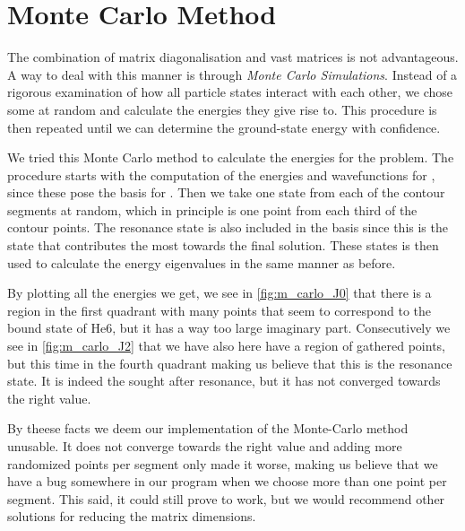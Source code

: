 \documentclass[../main/report.tex]{subfiles}
\begin{document}
\chapter{Monte Carlo Method}
\label{cha:monte_carlo}

The combination of matrix diagonalisation and vast matrices is not advantageous.
A way to deal with this manner is through \emph{Monte Carlo Simulations}.
Instead of a rigorous examination of how all particle states interact with each other, we chose some at random and calculate the energies they give rise to.
This procedure is then repeated until we can determine the ground-state energy with confidence.

We tried this Monte Carlo method to calculate the energies for the  problem.
The procedure starts with the computation of the energies and wavefunctions for , since these pose the basis for .
Then we take one state from each of the contour segments at random, which in principle is one point from each third of the contour points.
The resonance state is also included in the basis since this is the state that contributes the most towards the final solution.
These states is then used to calculate the energy eigenvalues in the same manner as before.

By plotting all the energies we get, we see in \cref{fig:m_carlo_J0} that there is a region in the first quadrant with many points that seem to correspond to the  bound state of He{6}, but it has a way too large imaginary part.
Consecutively we see in \cref{fig:m_carlo_J2} that we have also here have a region of gathered points, but this time in the fourth quadrant making us believe that this is the resonance state.
It is indeed the sought after resonance, but it has not converged towards the right value.

By theese facts we deem our implementation of the Monte-Carlo method unusable.
It does not converge towards the right value and adding more randomized points per segment only made it worse, making us believe that we have a bug somewhere in our program when we choose more than one point per segment.
This said, it could still prove to work, but we would recommend other solutions for reducing the matrix dimensions.

\end{document}
